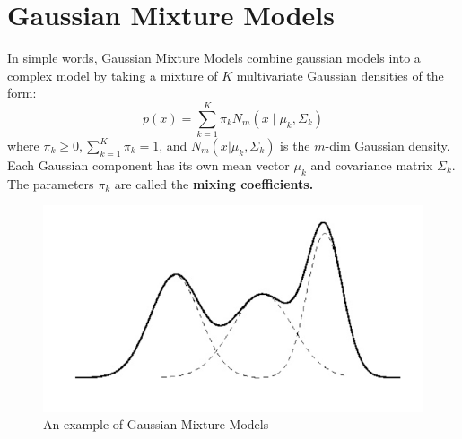 \section{Gaussian Mixture Models}
In simple words, Gaussian Mixture Models combine gaussian models into a complex model by taking a mixture of $K$ multivariate Gaussian densities of the form:
$$
p(x)=\sum_{k=1}^K \pi_k N_m\left(x \mid \mu_k, \Sigma_k\right)
$$
where $\pi_k \geq 0, \sum_{k=1}^K \pi_k=1$, and $N_m\left(x |\mu_k, \Sigma_k\right)$ is the $m$-dim Gaussian density.\\
Each Gaussian component has its own mean vector $\mu_k$ and covariance matrix $\Sigma_k$.\\
The parameters $\pi_k$ are called the \textbf{mixing coefficients.}

\begin{figure}[H]
    \centering
    \includegraphics[width = .4\linewidth]{codes/figures/section9/figure_9_1.png}
    \caption{An example of Gaussian Mixture Models}
    \label{fig:Gaussian-Mixture}
\end{figure}